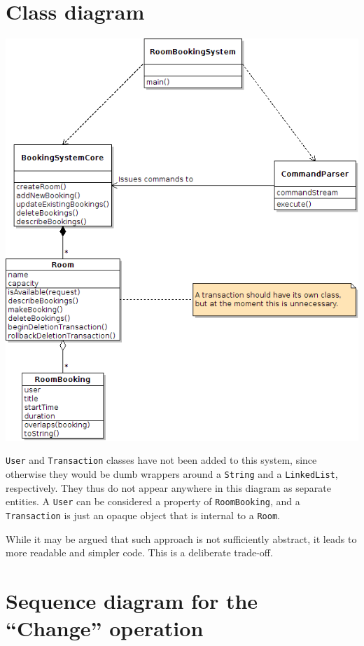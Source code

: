 \documentclass[a4paper,11pt]{article}
\begin{document}
\section*{Class diagram}

\includegraphics[scale=0.7]{../uml/RoomBooking.png}
\vspace{5mm}

\texttt{User} and \texttt{Transaction} classes have not been added to this
system, since otherwise they would be dumb wrappers around a \texttt{String} and
a \texttt{LinkedList}, respectively. They thus do not appear anywhere in this
diagram as separate entities. A \texttt{User} can be considered a property of
\texttt{RoomBooking}, and a \texttt{Transaction} is just an opaque object
that is internal to a \texttt{Room}.

While it may be argued that such approach is not sufficiently abstract, it leads
to more readable and simpler code. This is a deliberate trade-off.

\section*{Sequence diagram for the ``Change'' operation}
\end{document}
